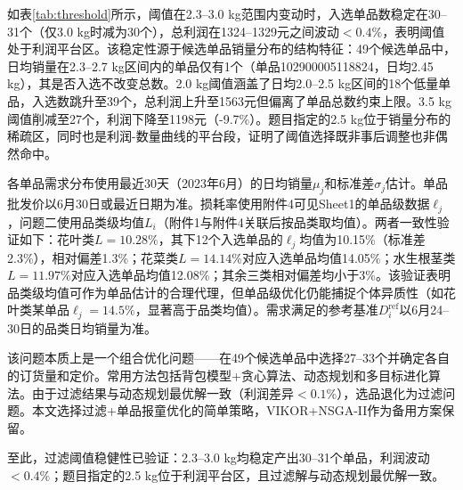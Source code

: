 如表\ref{tab:threshold}所示，阈值在2.3--3.0 kg范围内变动时，入选单品数稳定在30--31个（仅3.0 kg时减为30个），总利润在1324--1329元之间波动$<0.4\%$，表明阈值处于利润平台区。该稳定性源于候选单品销量分布的结构特征：49个候选单品中，日均销量在2.3--2.7 kg区间内的单品仅有1个（单品102900005118824，日均2.45 kg），其是否入选不改变总数。2.0 kg阈值涵盖了日均2.0--2.5 kg区间的18个低量单品，入选数跳升至39个，总利润上升至1563元但偏离了单品总数约束上限。3.5 kg阈值削减至27个，利润下降至1198元（-9.7\%）。题目指定的2.5 kg位于销量分布的稀疏区，同时也是利润-数量曲线的平台段，证明了阈值选择既非事后调整也非偶然命中。

各单品需求分布使用最近30天（2023年6月）的日均销量$\mu_j$和标准差$\sigma_j$估计。单品批发价以6月30日或最近日期为准。损耗率使用附件4可见Sheet1的单品级数据$\ell_j$，问题二使用品类级均值$L_i$（附件1与附件4关联后按品类取均值）。两者一致性验证如下：花叶类$L=10.28\%$，其下12个入选单品的$\ell_j$均值为10.15\%（标准差2.3\%），相对偏差1.3\%；花菜类$L=14.14\%$对应入选单品均值14.05\%；水生根茎类$L=11.97\%$对应入选单品均值12.08\%；其余三类相对偏差均小于3\%。该验证表明品类级均值可作为单品估计的合理代理，但单品级优化仍能捕捉个体异质性（如花叶类某单品$\ell_j=14.5\%$，显著高于品类均值）。需求满足的参考基准$D_i^{\text{ref}}$以6月24--30日的品类日均销量为准。

该问题本质上是一个组合优化问题——在49个候选单品中选择27--33个并确定各自的订货量和定价。常用方法包括背包模型+贪心算法、动态规划和多目标进化算法。由于过滤结果与动态规划最优解一致（利润差异$<0.1\%$），选品退化为过滤问题。本文选择过滤+单品报童优化的简单策略，VIKOR+NSGA-II作为备用方案保留。

至此，过滤阈值稳健性已验证：2.3--3.0 kg均稳定产出30--31个单品，利润波动$<0.4\%$；题目指定的2.5 kg位于利润平台区，且过滤解与动态规划最优解一致。
